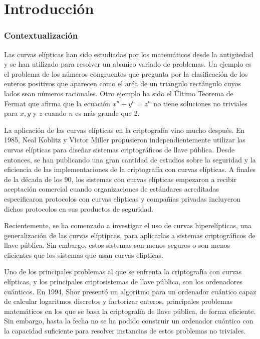 \chapter{Introducción}
\label{ch:Introducción}

\subsection{Contextualización}
\label{sub:Contextualización}


Las curvas elípticas han sido estudiadas por los matemáticos desde la antigüedad y se han utilizado para resolver un abanico variado de problemas. Un ejemplo es el problema de los números congruentes que pregunta por la clasificación de los enteros positivos que aparecen como el aréa de un triangulo rectángulo cuyos lados sean números racionales. Otro ejemplo ha sido el Último Teorema de Fermat que afirma que la ecuación $x^n + y^n = z^n$ no tiene soluciones no triviales para $x, y$ y $z$ cuando $n$ es más grande que 2.

La aplicación de las curvas elípticas en la criptografía vino mucho después. En 1985, Neal Koblitz y Victor Miller propusieron independientemente utilizar las curvas elípticas para diseñar sistemas criptográficos de llave pública. Desde entonces, se han publicando una gran cantidad de estudios sobre la seguridad y la eficiencia de las implementaciones de la criptografía con curvas elípticas. A finales de la década de los 90, los sistemas con curvas elípticas empezaron a recibir aceptación comercial cuando organizaciones de estándares acreditadas especificaron protocolos con curvas elípticas y compañías privadas incluyeron dichos protocolos en sus productos de seguridad.

Recientemente, se ha comenzado a investigar el uso de curvas hiperelípticas, una generalización de las curvas elíptipcas, para aplicarlas a sistemas criptográficos de llave pública. Sin embargo, estos sistemas son menos seguros o son menos eficientes que los sistemas que usan curvas elípticas.

Uno de los principales problemas al que se enfrenta la criptografía con curvas elípticas, y los principales criptosistemas de llave pública, son los ordenadores cuánticos. En 1994, Shor presentó un algoritmo para un ordenador cuántico capaz de calcular logaritmos discretos y factorizar enteros, principales problemas matemáticos en los que se basa la criptografía de llave pública, de forma eficiente. Sin embargo, hasta la fecha no se ha podido construir un ordenador cuántico con la capacidad suficiente para resolver instancias de estos problemas no triviales.

